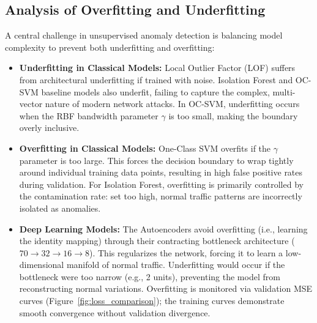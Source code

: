 \subsection{Analysis of Overfitting and Underfitting}
A central challenge in unsupervised anomaly detection is balancing model complexity to prevent both underfitting and overfitting:
\begin{itemize}
    \item \textbf{Underfitting in Classical Models:} Local Outlier Factor (LOF) suffers from architectural underfitting if trained with noise. Isolation Forest and OC-SVM baseline models also underfit, failing to capture the complex, multi-vector nature of modern network attacks. In OC-SVM, underfitting occurs when the RBF bandwidth parameter $\gamma$ is too small, making the boundary overly inclusive.
    \item \textbf{Overfitting in Classical Models:} One-Class SVM overfits if the $\gamma$ parameter is too large. This forces the decision boundary to wrap tightly around individual training data points, resulting in high false positive rates during validation. For Isolation Forest, overfitting is primarily controlled by the contamination rate: set too high, normal traffic patterns are incorrectly isolated as anomalies.
    \item \textbf{Deep Learning Models:} The Autoencoders avoid overfitting (i.e., learning the identity mapping) through their contracting bottleneck architecture ($70 \to 32 \to 16 \to 8$). This regularizes the network, forcing it to learn a low-dimensional manifold of normal traffic. Underfitting would occur if the bottleneck were too narrow (e.g., 2 units), preventing the model from reconstructing normal variations. Overfitting is monitored via validation MSE curves (Figure~\ref{fig:loss_comparison}); the training curves demonstrate smooth convergence without validation divergence.
\end{itemize}



